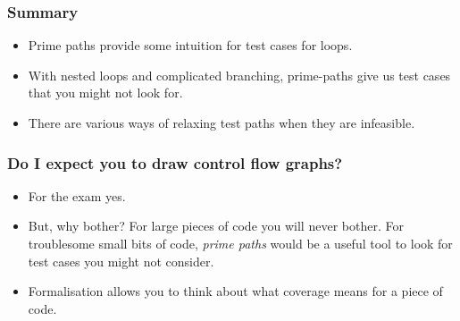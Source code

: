 \documentclass[handout]{beamer}
\begin{document}
\begin{frame}
  \frametitle{Summary}

  \begin{itemize}
  \item  Prime paths provide some intuition for test cases for loops.
  \item  With nested loops and complicated branching, prime-paths give
    us test cases that you might not look for.
  \item There are various ways of relaxing test paths when they are infeasible.
  \end{itemize}
\end{frame}

\begin{frame}
  \frametitle{Do I expect you to draw control flow graphs?}
  \begin{itemize}
  \item For the exam yes. 
  \item But, why bother? For large pieces of code you will never bother. For
    troublesome small bits of code, {\it prime paths} would be a useful tool to look
    for test cases you might not consider.
  \item Formalisation allows you to think about what coverage means for a
    piece of code.
  \end{itemize}
\end{frame}
\end{document}
